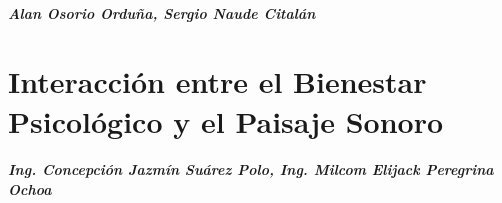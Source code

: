     \paragraph{Alan Osorio Orduña, Sergio Naude Citalán}
    

    \chapter{Interacción entre el Bienestar Psicológico y el Paisaje Sonoro}
    \paragraph{Ing. Concepción Jazmín Suárez Polo, Ing. Milcom Elijack Peregrina Ochoa}
    






